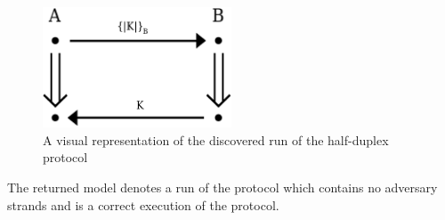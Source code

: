 		\begin{figure}[h]
			\centering
			\includegraphics[width=0.5\textwidth]{half-duplexCompleted}
			\caption{
				A visual representation of the discovered run of the half-duplex protocol
				\label{fig:half_duplex_completed}
			}
		\end{figure}

		The returned model denotes a run of the protocol which contains no
		adversary strands and is a correct execution of the protocol.
